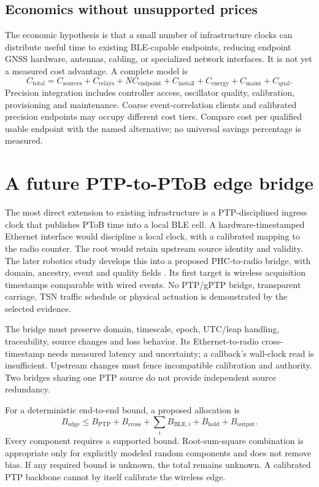 \documentclass[11pt,letterpaper]{article}
\begin{document}
\subsection{Economics without unsupported prices}
The economic hypothesis is that a small number of infrastructure clocks can distribute useful time to existing BLE-capable endpoints, reducing endpoint GNSS hardware, antennas, cabling, or specialized network interfaces. It is not yet a measured cost advantage. A complete model is
\begin{equation}
C_{\mathrm{total}}=C_{\mathrm{sources}}+C_{\mathrm{relays}}+N C_{\mathrm{endpoint}}+C_{\mathrm{install}}+C_{\mathrm{energy}}+C_{\mathrm{maint}}+C_{\mathrm{qual}}.
\end{equation}
Precision integration includes controller access, oscillator quality, calibration, provisioning and maintenance. Coarse event-correlation clients and calibrated precision endpoints may occupy different cost tiers. Compare cost per qualified usable endpoint with the named alternative; no universal savings percentage is measured.

\section{A future PTP-to-PToB edge bridge}\label{sec:ptp}
The most direct extension to existing infrastructure is a PTP-disciplined ingress clock that publishes PToB time into a local BLE cell. A hardware-timestamped Ethernet interface would discipline a local clock, with a calibrated mapping to the radio counter. The root would retain upstream source identity and validity. The later robotics study develops this into a proposed PHC-to-radio bridge, with domain, ancestry, event and quality fields \cite{robotics}. Its first target is wireless acquisition timestamps comparable with wired events. No PTP/gPTP bridge, transparent carriage, TSN traffic schedule or physical actuation is demonstrated by the selected evidence.

The bridge must preserve domain, timescale, epoch, UTC/leap handling, traceability, source changes and loss behavior. Its Ethernet-to-radio cross-timestamp needs measured latency and uncertainty; a callback's wall-clock read is insufficient. Upstream changes must fence incompatible calibration and authority. Two bridges sharing one PTP source do not provide independent source redundancy.

For a deterministic end-to-end bound, a proposed allocation is
\begin{equation}
B_{\mathrm{edge}}\leq B_{\mathrm{PTP}}+B_{\mathrm{cross}}+\sum_i B_{\mathrm{BLE},i}+B_{\mathrm{hold}}+B_{\mathrm{output}}.
\end{equation}
Every component requires a supported bound. Root-sum-square combination is appropriate only for explicitly modeled random components and does not remove bias. If any required bound is unknown, the total remains unknown. A calibrated PTP backbone cannot by itself calibrate the wireless edge.
\end{document}
